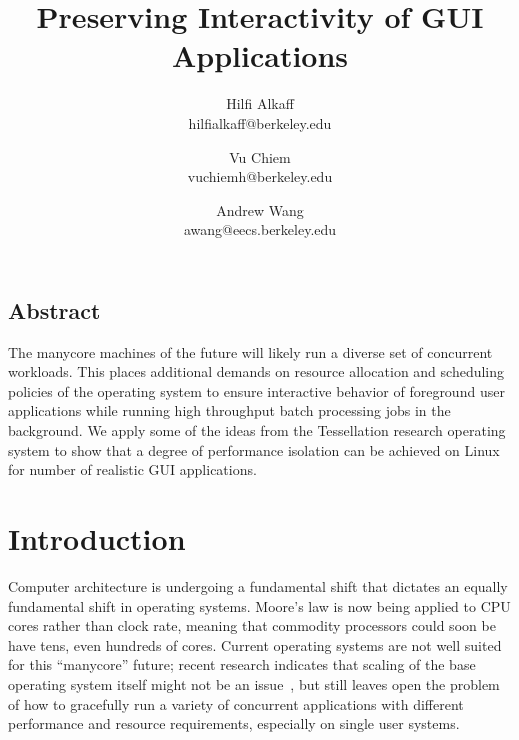 \documentclass[letterpaper,twocolumn,11pt]{article}
\begin{document}
\date{}

\title{\Large \bf Preserving Interactivity of GUI Applications}

\author{
{\rm Hilfi Alkaff}\\
hilfialkaff@berkeley.edu
\and
{\rm Vu Chiem}\\
vuchiemh@berkeley.edu
\and
{\rm Andrew Wang}\\
awang@eecs.berkeley.edu
} %

\maketitle



\subsection*{Abstract}
The manycore machines of the future will likely run a diverse set of concurrent workloads. This places additional demands on resource allocation and scheduling policies of the operating system to ensure interactive behavior of foreground user applications while running high throughput batch processing jobs in the background. We apply some of the ideas from the Tessellation research operating system to show that a degree of performance isolation can be achieved on Linux for number of realistic GUI applications.

\section{Introduction}

Computer architecture is undergoing a fundamental shift that dictates an equally fundamental shift in operating systems. Moore's law is now being applied to CPU cores rather than clock rate, meaning that commodity processors could soon be have tens, even hundreds of cores. Current operating systems are not well suited for this ``manycore'' future; recent research indicates that scaling of the base operating system itself might not be an issue~\cite{linux:osdi10}, but still leaves open the problem of how to gracefully run a variety of concurrent applications with different performance and resource requirements, especially on single user systems.
\end{document}
